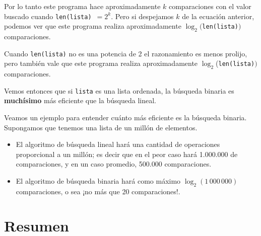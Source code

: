 Por lo tanto este programa hace aproximadamente $k$ comparaciones con el valor
buscado cuando \lstinline+len(lista)+~$= 2^k$.
Pero si despejamos $k$ de la ecuación anterior, podemos ver que este programa
realiza aproximadamente $\log_2($\lstinline+len(lista)+$)$ comparaciones.

Cuando \lstinline+len(lista)+ no es una potencia de 2 el razonamiento es menos
prolijo, pero también vale que este programa realiza aproximadamente
$\log_2$(\lstinline+len(lista)+$)$ comparaciones.

\begin{observacion}
Vemos entonces que si \lstinline!lista! es una lista ordenada, la búsqueda binaria es
{\bf muchísimo} más eficiente que la búsqueda lineal.
\end{observacion}

Veamos un ejemplo para entender cuánto más eficiente es la búsqueda binaria.
Supongamos que tenemos una lista de un millón de elementos.

\begin{itemize}
\item El algoritmo de búsqueda lineal hará una cantidad de operaciones proporcional
a un millón; es decir que en el peor caso hará 1.000.000 de comparaciones, y en
un caso promedio, 500.000 comparaciones.
\item El algoritmo de búsqueda binaria hará como máximo $\log_2(1\,000\,000)$
comparaciones, o sea ¡no más que 20 comparaciones!.
\end{itemize}

\section{Resumen}

